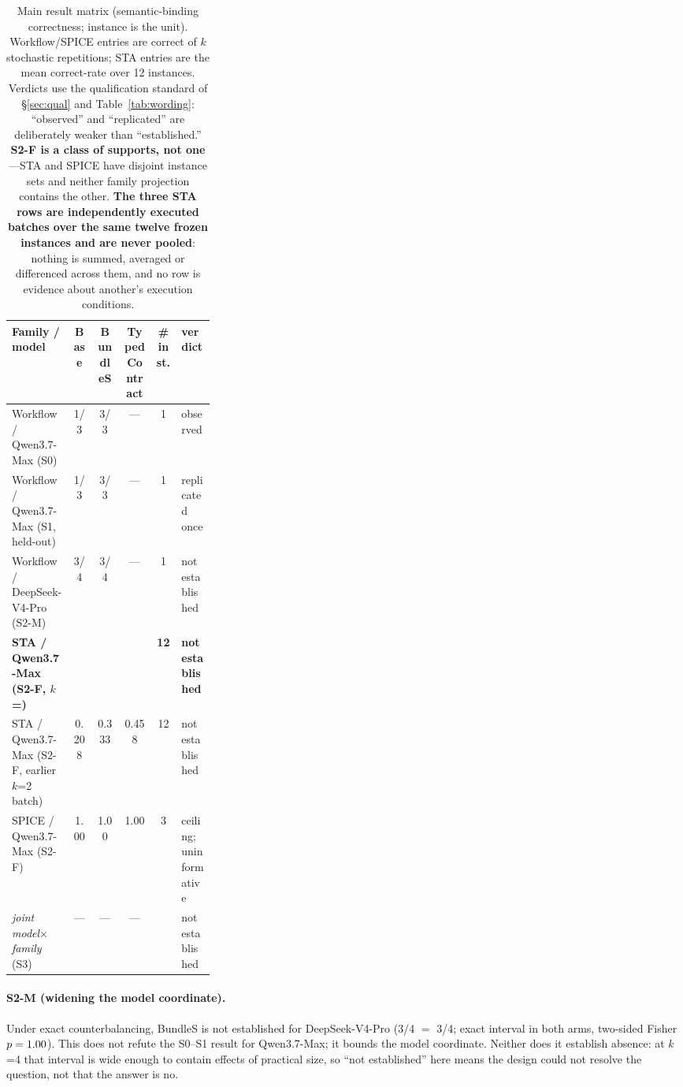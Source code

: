 \documentclass{article}
\begin{document}
\begin{table}[h]
\centering\small
\setlength{\tabcolsep}{4pt}
\caption{Main result matrix (semantic-binding correctness; instance is the unit). Workflow/SPICE entries are correct of $k$ stochastic repetitions; STA entries are the mean correct-rate over 12 instances. Verdicts use the qualification standard of \S\ref{sec:qual} and Table~\ref{tab:wording}: ``observed'' and ``replicated'' are deliberately weaker than ``established.'' \textbf{S2-F is a class of supports, not one}---STA and SPICE have disjoint instance sets and neither family projection contains the other. \textbf{The three STA rows are independently executed batches over the same twelve frozen instances and are never pooled}: nothing is summed, averaged or differenced across them, and no row is evidence about another's execution conditions.}
\label{tab:main}
\begin{tabular}{p{0.30\linewidth} c c c c l}
\toprule
Family / model & Base & BundleS & TypedContract & \#inst. & verdict \\
\midrule
Workflow / Qwen3.7-Max (S0) & 1/3 & 3/3 & --- & 1 & observed \\
Workflow / Qwen3.7-Max (S1, held-out) & 1/3 & 3/3 & --- & 1 & replicated once \\
Workflow / DeepSeek-V4-Pro (S2-M) & 3/4 & 3/4 & --- & 1 & not established \\
\textbf{STA / Qwen3.7-Max (S2-F, $k$=\StatEightAK{})} & \textbf{\StatEightABase{}} & \textbf{\StatEightABundleS{}} & \textbf{\StatEightATC{}} & \textbf{12} & \textbf{not established} \\
STA / Qwen3.7-Max (S2-F, earlier $k$=2 batch) & 0.208 & 0.333 & 0.458 & 12 & not established \\
SPICE / Qwen3.7-Max (S2-F) & 1.00 & 1.00 & 1.00 & 3 & ceiling; uninformative \\
\emph{joint model$\times$family} (S3) & --- & --- & --- & \StatArmTwoEpisodes{} & not established \\
\bottomrule
\end{tabular}
\end{table}

\paragraph{S2-M (widening the model coordinate).} Under exact counterbalancing, BundleS is not established for DeepSeek-V4-Pro (3/4 $=$ 3/4; exact interval \StatSTwoMTreatCI{} in both arms, two-sided Fisher $p=1.00$). This does not refute the S0--S1 result for Qwen3.7-Max; it bounds the model coordinate. Neither does it establish absence: at $k$=4 that interval is wide enough to contain effects of practical size, so ``not established'' here means the design could not resolve the question, not that the answer is no.
\end{document}
